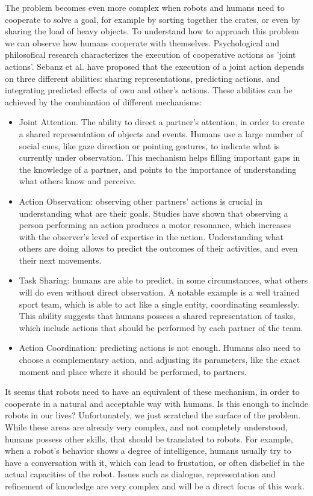 The problem becomes even more complex when robots and humans need to cooperate to solve a goal, for example by sorting together the crates, or even by sharing the load of heavy objects. To understand  how to approach this problem we can observe how humans cooperate with themselves. Psychological and philosofical research \cite{pacherie2012phenomenology} characterizes the execution of cooperative actions as 'joint actions'. Sebanz et al. \cite{sebanz2006joint} have proposed that the execution of a joint action depends on three different abilities: sharing representations, predicting actions, and integrating predicted effects of own and other's actions. These abilities can be achieved by the combination of different mechanisms:
\begin{itemize}
\item Joint Attention. The ability to direct a partner's attention, in order to create a shared representation of objects and events. Humans use a large number of social cues, like gaze direction or pointing gestures, to indicate what is currently under observation. This mechanism helps filling important gaps in the knowledge of a partner, and points to the importance of understanding what others know and perceive.
\item Action Observation: observing other partners' actions is crucial in understanding what are their goals. Studies have shown that observing a person performing an action produces a motor resonance, which increases with the observer's level of expertise in the action. Understanding what others are doing allows to predict the outcomes of their activities, and even their next movements.
\item Task Sharing: humans are able to predict, in some circumstances, what others will do  even without direct observation. A notable example is a well trained sport team, which is able to act like a single entity, coordinating seamlessly. This ability suggests that humans possess a shared representation of tasks, which include actions that should be performed by each partner of the team.
\item Action Coordination: predicting actions is not enough. Humans also need to choose a complementary action, and adjusting its parameters, like the exact moment and place where it should be performed, to partners. 
\end{itemize}

It seems that robots need to have an equivalent of these mechanism, in order to cooperate in a natural and acceptable way with humans. Is this enough to include robots in our lives? Unfortunately, we just scratched the surface of the problem. While these areas are already very complex, and not completely understood, humans possess other skills, that should be translated to robots. For example, when a robot's behavior shows a degree of intelligence, humans usually try to have a conversation with it, which can lead to frustation, or often disbelief in the actual capacities of the robot. Issues such as dialogue, representation and refinement of knowledge are very complex and will be a direct focus of this work.

